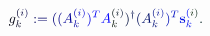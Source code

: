 \documentclass[12pt]{article}
\begin{document}
\makeatletter
\renewcommand*{\@textcolor}[3]{%
  \protect\leavevmode
  \begingroup
    \color#1{#2}#3%
  \endgroup
}
\makeatother
\begin{displaymath}
\mathcolor[RGB]{0,0,15}{g} _ { \mathcolor[RGB]{0,0,30}{k} } ^ { \mathcolor[RGB]{0,0,45}{(} \mathcolor[RGB]{0,0,60}{i} \mathcolor[RGB]{0,0,75}{)} } \mathcolor[RGB]{0,0,90}{:} \mathcolor[RGB]{0,0,105}{=} \mathcolor[RGB]{0,0,120}{(} \mathcolor[RGB]{0,0,135}{(} \mathcolor[RGB]{0,0,150}{A} _ { \mathcolor[RGB]{0,0,165}{k} } ^ { \mathcolor[RGB]{0,0,180}{(} \mathcolor[RGB]{0,0,195}{i} \mathcolor[RGB]{0,0,210}{)} } \mathcolor[RGB]{0,0,225}{)} ^ { \mathcolor[RGB]{0,0,240}{T} } \mathcolor[RGB]{0,0,255}{A} _ { \mathcolor[RGB]{0,15,0}{k} } ^ { \mathcolor[RGB]{0,15,15}{(} \mathcolor[RGB]{0,15,30}{i} \mathcolor[RGB]{0,15,45}{)} } \mathcolor[RGB]{0,15,60}{)} ^ { \mathcolor[RGB]{0,15,75}{\dagger} } \mathcolor[RGB]{0,15,90}{(} \mathcolor[RGB]{0,15,105}{A} _ { \mathcolor[RGB]{0,15,120}{k} } ^ { \mathcolor[RGB]{0,15,135}{(} \mathcolor[RGB]{0,15,150}{i} \mathcolor[RGB]{0,15,165}{)} } \mathcolor[RGB]{0,15,180}{)} ^ { \mathcolor[RGB]{0,15,195}{T} } { \mathcolor[RGB]{0,15,210}{\bf} \mathcolor[RGB]{0,15,225}{s} } _ { \mathcolor[RGB]{0,15,240}{k} } ^ { \mathcolor[RGB]{0,15,255}{(} \mathcolor[RGB]{0,30,0}{i} \mathcolor[RGB]{0,30,15}{)} } \mathcolor[RGB]{0,30,30}{.}
\end{displaymath}
\end{document}
